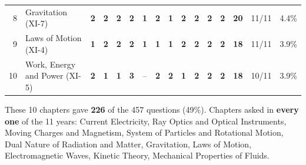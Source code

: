\documentclass[10pt,a4paper]{article}
\begin{document}
{\begin{tabularx}{\linewidth}{@{}r>{\raggedright\arraybackslash}X*{11}{c}ccc@{}}
8 & Gravitation {\scriptsize(XI-7)} & \textbf{2} & \textbf{2} & \textbf{2} & \textbf{2} & \textbf{1} & \textbf{2} & \textbf{1} & \textbf{2} & \textbf{2} & \textbf{2} & \textbf{2} & \textbf{20} & 11/11 & 4.4\%\\
9 & Laws of Motion {\scriptsize(XI-4)} & \textbf{1} & \textbf{2} & \textbf{2} & \textbf{2} & \textbf{1} & \textbf{1} & \textbf{1} & \textbf{2} & \textbf{2} & \textbf{2} & \textbf{2} & \textbf{18} & 11/11 & 3.9\%\\
10 & Work, Energy and Power {\scriptsize(XI-5)} & \textbf{2} & \textbf{1} & \textbf{1} & \textbf{3} & {\color{gray!60}--} & \textbf{2} & \textbf{2} & \textbf{1} & \textbf{2} & \textbf{2} & \textbf{2} & \textbf{18} & 10/11 & 3.9\%\\
\bottomrule\end{tabularx}}\par\smallskip
{\small These 10 chapters gave \textbf{226} of the 457 questions (49\%).
Chapters asked in \textbf{every one} of the 11 years: Current Electricity, Ray Optics and Optical Instruments, Moving Charges and Magnetism, System of Particles and Rotational Motion, Dual Nature of Radiation and Matter, Gravitation, Laws of Motion, Electromagnetic Waves, Kinetic Theory, Mechanical Properties of Fluids.}\par\clearpage
\end{document}
